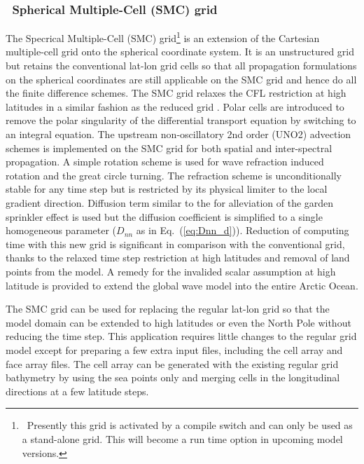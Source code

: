 \vssub
\subsubsection{~Spherical Multiple-Cell (SMC) grid} \label{sub:num_space_SMC}

\noindent
The Specrical Multiple-Cell (SMC) grid\footnote{~Presently this grid is
activated by a compile switch and can only be used as a stand-alone grid. This
will become a run time option in upcoming model versions.}  \citep{art:Li11}
is an extension of the Cartesian multiple-cell grid \citep{art:Li03} onto the
spherical coordinate system. It is an unstructured grid but retains the
conventional lat-lon grid cells so that all propagation formulations on the
spherical coordinates are still applicable on the SMC grid and hence do all
the finite difference schemes. The SMC grid relaxes the CFL restriction at
high latitudes in a similar fashion as the reduced grid
\citep{art:RA94}. Polar cells are introduced to remove the polar singularity
of the differential transport equation by switching to an integral
equation. The upstream non-oscillatory 2nd order (UNO2) advection schemes
\citep{art:Li08} is implemented on the SMC grid for both spatial and
inter-spectral propagation. A simple rotation scheme is used for wave
refraction induced rotation and the great circle turning.  The refraction
scheme is unconditionally stable for any time step but is restricted by its
physical limiter to the local gradient direction.  Diffusion term similar to
the \cite{art:BH87} for alleviation of the garden sprinkler effect is used but
the diffusion coefficient is simplified to a single homogeneous parameter
($D_{nn}$ as in Eq.~(\ref{eq:Dnn_d})).  Reduction of computing time with this
new grid is significant in comparison with the conventional grid, thanks to
the relaxed time step restriction at high latitudes and removal of land points
from the model. A remedy for the invalided scalar assumption at high latitude
is provided to extend the global wave model into the entire Arctic Ocean.

The SMC grid can be used for replacing the regular lat-lon grid so that the
model domain can be extended to high latitudes or even the North Pole without
reducing the time step. This application requires little changes to the
regular grid model except for preparing a few extra input files, including the
cell array and face array files. The cell array can be generated with the
existing regular grid bathymetry by using the sea points only and merging
cells in the longitudinal directions at a few latitude steps.

